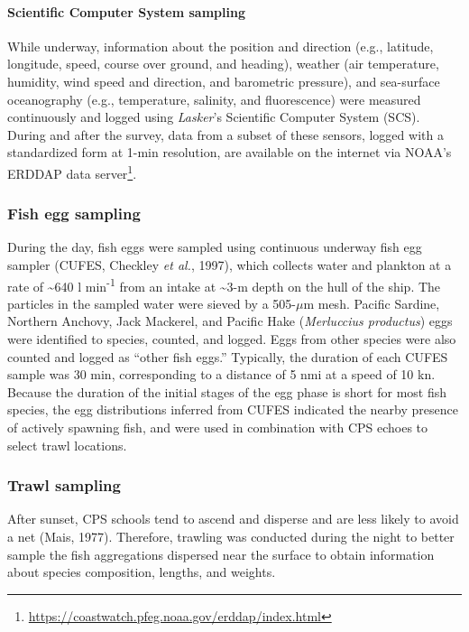\documentclass[]{article}
\let\oldparagraph\paragraph
\renewcommand{\paragraph}[1]{\oldparagraph{#1}\mbox{}}
\let\rmarkdownfootnote\footnote%
\def\footnote{\protect\rmarkdownfootnote}
\begin{document}
\hypertarget{methods-scs-sampling}{%
\paragraph{Scientific Computer System sampling}\label{methods-scs-sampling}}

While underway, information about the position and direction (e.g., latitude, longitude, speed, course over ground, and heading), weather (air temperature, humidity, wind speed and direction, and barometric pressure), and sea-surface oceanography (e.g., temperature, salinity, and fluorescence) were measured continuously and logged using \emph{Lasker}'s Scientific Computer System (SCS). During and after the survey, data from a subset of these sensors, logged with a standardized form at 1-min resolution, are available on the internet via NOAA's ERDDAP data server\footnote{\url{https://coastwatch.pfeg.noaa.gov/erddap/index.html}}.

\hypertarget{methods-cufes-sampling}{%
\subsubsection{Fish egg sampling}\label{methods-cufes-sampling}}

During the day, fish eggs were sampled using continuous underway fish egg sampler (CUFES, Checkley \emph{et al.}, 1997), which collects water and plankton at a rate of \textasciitilde640 l min\textsuperscript{-1} from an intake at \textasciitilde3-m depth on the hull of the ship. The particles in the sampled water were sieved by a 505-\(\mu\)m mesh. Pacific Sardine, Northern Anchovy, Jack Mackerel, and Pacific Hake (\emph{Merluccius productus}) eggs were identified to species, counted, and logged. Eggs from other species were also counted and logged as ``other fish eggs.'' Typically, the duration of each CUFES sample was 30 min, corresponding to a distance of 5 nmi at a speed of 10 kn. Because the duration of the initial stages of the egg phase is short for most fish species, the egg distributions inferred from CUFES indicated the nearby presence of actively spawning fish, and were used in combination with CPS echoes to select trawl locations.

\hypertarget{methods-trawl-sampling}{%
\subsubsection{Trawl sampling}\label{methods-trawl-sampling}}

After sunset, CPS schools tend to ascend and disperse and are less likely to avoid a net (Mais, 1977). Therefore, trawling was conducted during the night to better sample the fish aggregations dispersed near the surface to obtain information about species composition, lengths, and weights.
\end{document}
